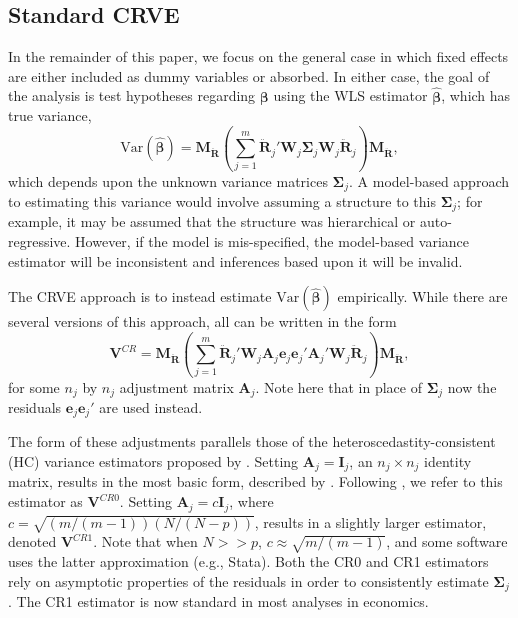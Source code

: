 \documentclass[12pt]{article}
\newcommand{\Var}{\text{Var}}
\newcommand{\bm}{\mathbf}
\newcommand{\bs}{\boldsymbol}
\begin{document}
\subsection{Standard CRVE}

In the remainder of this paper, we focus on the general case in which fixed effects are either included as dummy variables or absorbed. 
In either case, the goal of the analysis is test hypotheses regarding $\bs\beta$ using the WLS estimator $\bs{\hat\beta}$, which has true variance,
\begin{equation}
\label{eq:var_WLS}
\Var\left(\bs{\hat\beta}\right) = \bm{M_{\ddot{R}}}\left(\sum_{j=1}^m \bm{\ddot{R}}_j' \bm{W}_j \bs\Sigma_j \bm{W}_j\bm{\ddot{R}}_j\right) \bm{M_{\ddot{R}}},
\end{equation}
which depends upon the unknown variance matrices $\bm\Sigma_j$. 
A model-based approach to estimating this variance would involve assuming a structure to this $\bm\Sigma_j$; for example, it may be assumed that the structure was hierarchical or auto-regressive. 
However, if the model is mis-specified, the model-based variance estimator will be inconsistent and inferences based upon it will be invalid.

The CRVE approach is to instead estimate $\Var\left(\bs{\hat\beta}\right)$ empirically. 
While there are several versions of this approach, all can be written in the form
\begin{equation}
\label{eq:V_small}
\bm{V}^{CR} = \bm{M_{\ddot{R}}}\left(\sum_{j=1}^m \bm{\ddot{R}}_j'\bm{W}_j \bm{A}_j \bm{e}_j \bm{e}_j' \bm{A}_j' \bm{W}_j \bm{\ddot{R}}_j\right) \bm{M_{\ddot{R}}},
\end{equation}
for some $n_j$ by $n_j$ adjustment matrix $\bm{A}_j$. 
Note here that in place of $\bm\Sigma_j$ now the residuals $\bm{e}_j \bm{e}_j'$ are used instead. 

The form of these adjustments parallels those of the heteroscedastity-consistent (HC) variance estimators proposed by \citet*{MacKinnon1985some}. 
Setting $\bm{A}_j = \bm{I}_j$, an $n_j \times n_j$ identity matrix, results in the most basic form, described by \citet{Liang1986longitudinal}. 
Following \citet{Cameron2015practitioners}, we refer to this estimator as $\bm{V}^{CR0}$. 
Setting $\bm{A}_j = c\bm{I}_j$, where $c = \sqrt{(m/(m-1))(N/(N - p))}$, results in a slightly larger estimator, denoted $\bm{V}^{CR1}$.
Note that when $N >> p$, $c \approx \sqrt{m/(m-1)}$, and some software uses the latter approximation (e.g., Stata).
Both the CR0 and CR1 estimators rely on asymptotic properties of the residuals in order to consistently estimate $\bs\Sigma_j$. 
The CR1 estimator is now standard in most analyses in economics.
\end{document}
